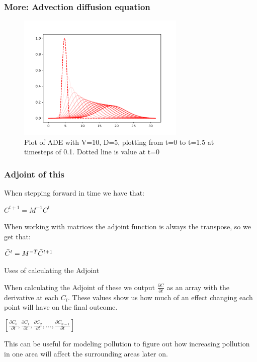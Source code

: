 \documentclass{beamer}
\begin{document}
\begin{frame}
\frametitle{More: Advection diffusion equation}

\begin{figure}[h]
    \centering
    \includegraphics[width=8cm]{images/Figure_1_ODE2.pdf}
    \caption{Plot of ADE with V=10, D=5, plotting from t=0 to t=1.5 at timesteps of 0.1. Dotted line is value at t=0}
    \label{fig:ODE}
\end{figure}

\end{frame}


\begin{frame}
\frametitle{Adjoint of this}

When stepping forward in time we have that:

\begin{center}
    $C^{t+1} = M^{-1} C^{t}$
\end{center}

When working with matrices the adjoint function is always the transpose, so we get that:

\begin{center}
    $\Bar{C}^{t} = M^{-T} \Bar{C}^{t+1}$
\end{center}

\end{frame}

\begin{frame}{Uses of calculating the Adjoint}

When calculating the Adjoint of these we output $\frac{\partial C}{\partial t}$ as an array with the derivative at each $C_i$. These values show us how much of an effect changing each point will have on the final outcome.

\begin{center}
    $[\frac{\partial C_0}{\partial t}, \frac{\partial C_1}{\partial t}, \frac{\partial C_2}{\partial t}, ..., \frac{\partial C_{n-1}}{\partial t}]$
\end{center}


This can be useful for modeling pollution to figure out how increasing pollution in one area will affect the surrounding areas later on.

\end{frame}
\end{document}
